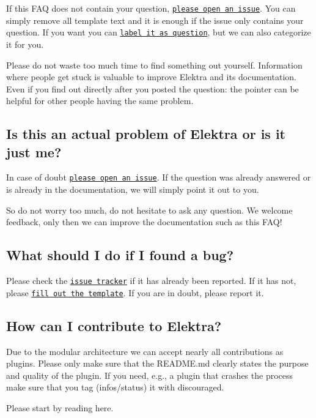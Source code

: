 If this F\+AQ does not contain your question, \href{https://git.libelektra.org/issues}{\tt please open an issue}. You can simply remove all template text and it is enough if the issue only contains your question. If you want you can \href{https://git.libelektra.org/issues/labels/question}{\tt label it as question}, but we can also categorize it for you.

Please do not waste too much time to find something out yourself. Information where people get stuck is valuable to improve Elektra and its documentation. Even if you find out directly after you posted the question\+: the pointer can be helpful for other people having the same problem.

\subsection*{Is this an actual problem of Elektra or is it just me?}

In case of doubt \href{https://git.libelektra.org/issues}{\tt please open an issue}. If the question was already answered or is already in the documentation, we will simply point it out to you.

So do not worry too much, do not hesitate to ask any question. We welcome feedback, only then we can improve the documentation such as this F\+A\+Q!

\subsection*{What should I do if I found a bug?}

Please check the \href{https://git.libelektra.org/issues}{\tt issue tracker} if it has already been reported. If it has not, please \href{https://git.libelektra.org/issues/new}{\tt fill out the template}. If you are in doubt, please report it.

\subsection*{How can I contribute to Elektra?}

Due to the modular architecture we can accept nearly all contributions as plugins. Please only make sure that the R\+E\+A\+D\+M\+E.\+md clearly states the purpose and quality of the plugin. If you need, e.\+g., a plugin that crashes the process make sure that you tag ({\ttfamily infos/status}) it with {\ttfamily discouraged}.

Please start by reading here.

